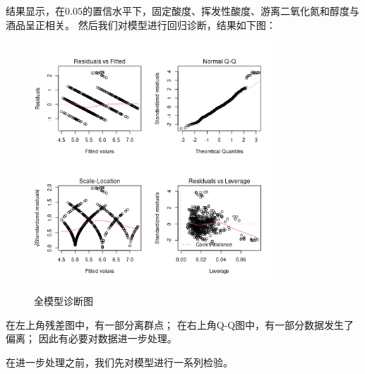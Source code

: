 \documentclass[fontset=ubuntu]{ctexart}
\begin{document}
            结果显示，在0.05的置信水平下，固定酸度、挥发性酸度、游离二氧化氮和醇度与酒品呈正相关。
            \clearpage
            然后我们对模型进行回归诊断，结果如下图：

            \begin{figure}[htbp]
                \centering
                \includegraphics[width=0.8\textwidth]{../model-summary/linear-model-plot.png}
                \label{fig:linear-model}
                \caption{全模型诊断图}
            \end{figure}

            在左上角残差图中，有一部分离群点；
            在右上角Q-Q图中，有一部分数据发生了偏离；
            因此有必要对数据进一步处理。

            在进一步处理之前，我们先对模型进行一系列检验。
            \clearpage
\end{document}

